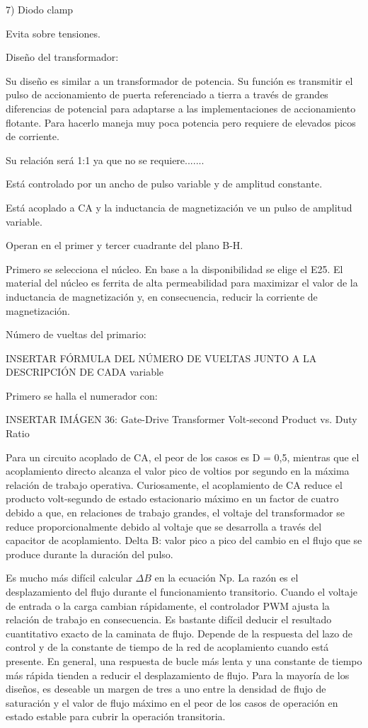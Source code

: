 7) Diodo clamp

Evita sobre tensiones.


Diseño del transformador:

Su diseño es similar a un transformador de potencia. 
Su función es transmitir el pulso de accionamiento de puerta referenciado a tierra a través de grandes diferencias de potencial para adaptarse a las implementaciones de accionamiento flotante. Para hacerlo maneja muy poca potencia pero requiere de elevados picos de corriente. 

Su relación será 1:1 ya que no se requiere.......

Está controlado por un ancho de pulso variable y de amplitud constante.

Está acoplado a CA y la inductancia de magnetización ve un pulso de amplitud variable.

Operan en el primer y tercer cuadrante del plano B-H.

Primero se selecciona el núcleo. En base a la disponibilidad se elige el E25. 
El material del núcleo es ferrita de alta permeabilidad para maximizar el valor de 
la inductancia de magnetización y, en consecuencia, reducir la corriente de magnetización.

Número de vueltas del primario: 

INSERTAR FÓRMULA DEL NÚMERO DE VUELTAS JUNTO A LA DESCRIPCIÓN DE CADA variable

Primero se halla el numerador con:

INSERTAR IMÁGEN 36: Gate-Drive Transformer Volt-second Product vs. Duty Ratio

Para un circuito acoplado de CA, el peor de los casos es D = 0,5, 
mientras que el acoplamiento directo alcanza el valor pico de voltios por segundo en la máxima relación de trabajo operativa. 
Curiosamente, el acoplamiento de CA reduce el producto volt-segundo de estado estacionario máximo en un factor de cuatro debido a que, 
en relaciones de trabajo grandes, el voltaje del transformador se reduce proporcionalmente debido al voltaje que 
se desarrolla a través del capacitor de acoplamiento.
Delta B: valor pico a pico del cambio en el flujo que se produce durante la duración del pulso. 

Es mucho más difícil calcular $\Delta B$ en la ecuación Np. 
La razón es el desplazamiento del flujo durante el funcionamiento transitorio. 
Cuando el voltaje de entrada o la carga cambian rápidamente, el controlador PWM ajusta la relación de trabajo en consecuencia. 
Es bastante difícil deducir el resultado cuantitativo exacto de la caminata de flujo. 
Depende de la respuesta del lazo de control y de la constante de tiempo de la red de acoplamiento cuando está presente. 
En general, una respuesta de bucle más lenta y una constante de tiempo más rápida tienden a reducir el desplazamiento de flujo. 
Para la mayoría de los diseños, es deseable un margen de tres a uno entre la densidad de flujo de saturación 
y el valor de flujo máximo en el peor de los casos de operación en estado estable para cubrir la operación transitoria.

